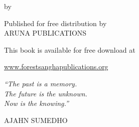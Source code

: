
{\pagestyle{empty}

{\raggedleft\setlength{\parskip}{1em}\setlength{\parindent}{0em}

\vspace*{4\baselineskip}
{\selectfont\titlepagetitlesize\color{textbody} \MakeUppercase{\bookTitle}%
\par\vspace*{\baselineskip}\vspace*{-0.1\baselineskip} {\titlepageauthorsize by \bookAuthor}}

\vfill

{\selectfont%
Published for free distribution by\\
ARUNA PUBLICATIONS

This book is available for free download at

\vspace*{-0.8\baselineskip}%
{\titlepagelinksize\href{http://www.forestsanghapublications.org/}{www.forestsanghapublications.org}}%

}

}

\mbox{}\newpage\thispagestyle{empty}%


\cleardoublepage

\mbox{}\vspace*{-\headsep}

\noindent%
\begin{minipage}[c][\textheight][c]{\paperwidth}

\noindent\hspace*{-20mm}%
\begin{minipage}{\paperwidth}
\centering

{\itshape ``The past is a memory. \\
The future is the unknown. \\
Now is the knowing.''}
\bigskip

{\smaller\MakeUppercase{Ajahn Sumedho}}

\end{minipage}

\end{minipage}

\clearpage\thispagestyle{empty}



\cleardoublepage\thispagestyle{empty}

\tableofcontents*

\thispagestyle{empty}


}
